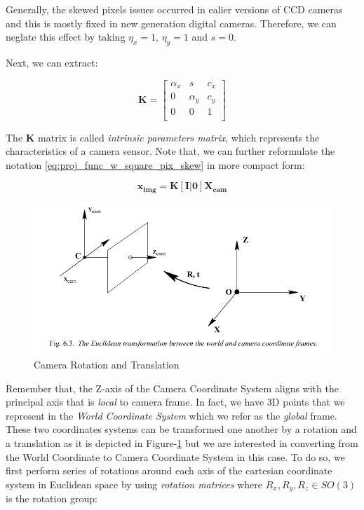 \documentclass[a4paper]{report}
\numberwithin{figure}{section}
\begin{document}
Generally, the skewed pixels issues occurred in ealier versions of CCD cameras 
and this is mostly fixed in new generation digital cameras. Therefore, 
we can neglate this effect by taking $\eta_x=1$, $\eta_y=1$ and $s=0$.

Next, we can extract:

\begin{equation}
  \mathbf{K} = 
  \begin{bmatrix}
    \alpha_x & s & c_x\\
    0 & \alpha_y & c_y\\
    0 & 0 & 1\\
  \end{bmatrix}
\end{equation} \label{eq:k_matrix}

The $\mathbf{K}$ matrix is called 
\textit{intrinsic parameters matrix}, which represents the characteristics of 
a camera sensor. Note that, we 
can further reformulate the notation \ref{eq:proj_func_w_square_pix_skew} in more 
compact form:

\begin{equation}
  \mathbf{x_{img}} = \mathbf{K}[\mathbf{I}|\mathbf{0}]\mathbf{X_{cam}}
\end{equation} \label{eq:simplyfied_proj_func}

\begin{figure}[H]
	\centering
  \includegraphics[width=\linewidth,natwidth=640,natheight=640]
  {fig/ref_imgs/cam_model_rot_trans.png}
  \caption{Camera Rotation and Translation}
  \label{fig:cam_model_rot_trans}
\end{figure}

Remember that, the Z-axis of the Camera Coordinate System aligns with the 
principal axis that is \textit{local} to camera frame. In fact, we have 3D points that 
we represent in the \textit{World Coordinate System} 
which we refer as the \textit{global} frame. 
These two coordinates systems 
can be transformed one another by a rotation and a translation as it is 
depicted in Figure-\ref{fig:cam_model_rot_trans} but we are interested in 
converting from the World Coordinate to Camera Coordinate System in this case.
To do so, we first perform series of rotations around each axis of the 
cartesian coordinate system in Euclidean space by using 
\textit{rotation matrices} where $R_x, R_y, R_z \in SO(3)$ is the rotation group:
\end{document}
